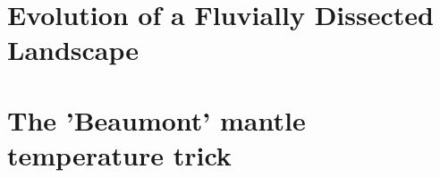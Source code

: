 \documentclass[a4paper,11pt]{report}
\begin{document}
\chapter{Evolution of a Fluvially Dissected Landscape \label{f140}}

\chapter{The 'Beaumont' mantle temperature trick \label{f141}}

\printbibliography
\end{document}
